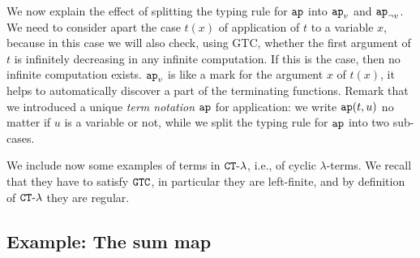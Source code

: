 \begin{remark}
  We now explain the effect of splitting the typing rule for ${\tt ap}$ into 
  $\apvar$ and $\apnotvar$.
We need to consider apart the case $t(x)$ of application of $t$ to a variable
$x$, because in this case we will also check, using GTC, 
whether the first argument of $t$ is infinitely decreasing in any infinite 
computation. If this is the case, then no infinite computation exists. $\apvar$ is like 
a mark  for the argument $x$ of $t(x)$,
it helps to automatically discover a part of the terminating functions.
Remark that we introduced a unique \emph{term notation ${\tt ap}$} for application: 
we write ${\tt ap}(t,u)$ no matter if $u$ is a variable or not, while we split 
the typing rule for ${\tt ap}$ into two sub-cases. 
\end{remark}

We include now some examples of terms in ${ {\tt CT}\mbox{-}\lambda}$, i.e., 
of cyclic $\lambda$-terms. We recall that they have to satisfy ${\tt GTC}$, 
in particular they are left-finite, and by definition of ${ {\tt CT}\mbox{-}\lambda}$ they are regular.




\subsection{Example: The sum map}

